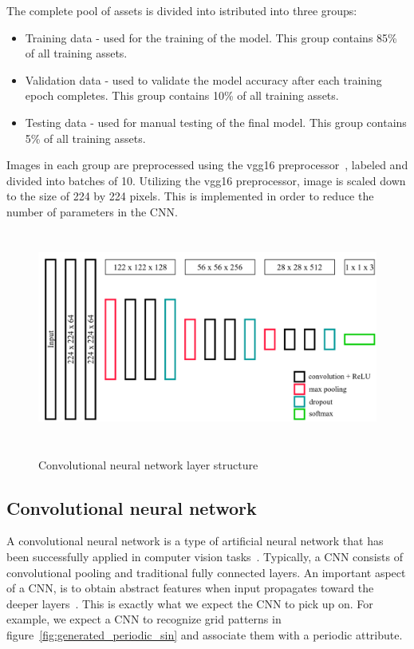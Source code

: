\documentclass[a4paper,12pt,fleqn]{article}
\begin{document}
The complete pool of assets is divided into istributed into three groups:
\begin{itemize}
  \item Training data - used for the training of the model. This group contains 85\% of all training assets.
  \item Validation data - used to validate the model accuracy after each training epoch completes. This group contains 10\% of all training assets.
  \item Testing data - used for manual testing of the final model. This group contains 5\% of all training assets.
\end{itemize}
Images in each group are preprocessed using the vgg16 preprocessor~\cite{brusilovsky:simonyan2014very}, labeled and divided into
batches of 10.
Utilizing the vgg16 preprocessor, image is scaled down to the size of 224 by 224 pixels.
This is implemented in order to reduce the number of parameters in the CNN.


\begin{figure}[h]
  \centering
  {\includegraphics[height=7cm]{assets/cnn_layers.png}}
  \caption{Convolutional neural network layer structure}
  \label{fig:cnn_layers}
\end{figure}


\subsection{Convolutional neural network}
A convolutional neural network is a type of artificial neural network that has been successfully applied in computer vision tasks~\cite{recent_advances_in_cnn}.
Typically, a CNN consists of convolutional pooling and traditional fully connected layers.
An important aspect of a CNN, is to obtain abstract features when input propagates toward the deeper layers~\cite{understanding_cnn}.
This is exactly what we expect the CNN to pick up on.
For example, we expect a CNN to recognize grid patterns in figure~\ref{fig:generated_periodic_sin} and associate them with a periodic attribute.
\end{document}
